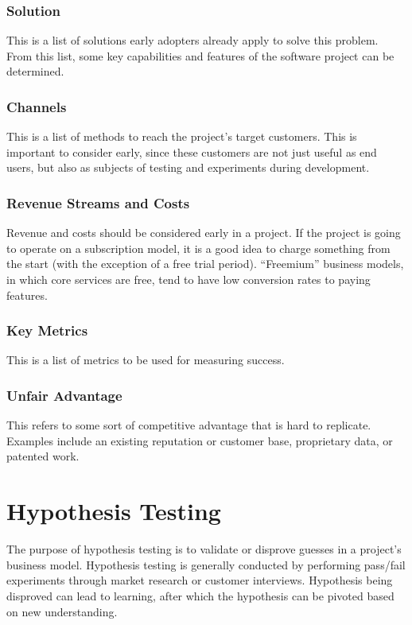 \documentclass[12pt,titlepage]{article}
\let\stdsection\section
\renewcommand\section{\clearpage\stdsection}
\begin{document}
      \subsubsection{Solution}
        This is a list of solutions early adopters already apply to solve this problem. From this list, some key capabilities and features
        of the software project can be determined.

      \subsubsection{Channels}
        This is a list of methods to reach the project's target customers. This is important to consider early, since these customers
        are not just useful as end users, but also as subjects of testing and experiments during development.

      \subsubsection{Revenue Streams and Costs}
        Revenue and costs should be considered early in a project. If the project is going to operate on a subscription model, it is
        a good idea to charge something from the start (with the exception of a free trial period). ``Freemium'' business models, in
        which core services are free, tend to have low conversion rates to paying features.

      \subsubsection{Key Metrics}
        This is a list of metrics to be used for measuring success.

      \subsubsection{Unfair Advantage}
        This refers to some sort of competitive advantage that is hard to replicate. Examples include an existing reputation or customer
        base, proprietary data, or patented work.

  \section{Hypothesis Testing}
    The purpose of hypothesis testing is to validate or disprove guesses in a project's business model. Hypothesis testing is generally
    conducted by performing pass/fail experiments through market research or customer interviews. Hypothesis being disproved can lead
    to learning, after which the hypothesis can be pivoted based on new understanding.
\end{document}
